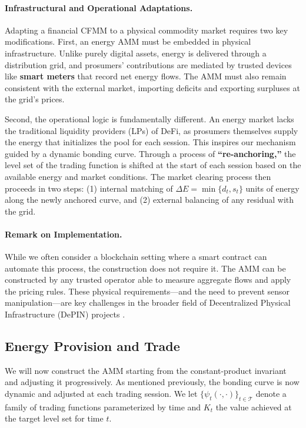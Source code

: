 \documentclass[12pt, notitlepage]{article}
\begin{document}
\paragraph{Infrastructural and Operational Adaptations.}
Adapting a financial CFMM to a physical commodity market requires two key modifications. First, an energy AMM must be embedded in physical infrastructure. Unlike purely digital assets, energy is delivered through a distribution grid, and prosumers' contributions are mediated by trusted devices like \textbf{smart meters} that record net energy flows. The AMM must also remain consistent with the external market, importing deficits and exporting surpluses at the grid's prices.

Second, the operational logic is fundamentally different. An energy market lacks the traditional liquidity providers (LPs) of DeFi, as prosumers themselves supply the energy that initializes the pool for each session. This inspires our mechanism guided by a dynamic bonding curve. Through a process of \textbf{“re-anchoring,”} the level set of the trading function is shifted at the start of each session based on the available energy and market conditions. The market clearing process then proceeds in two steps: (1) internal matching of $\Delta E = \min\{d_t,s_t\}$ units of energy along the newly anchored curve, and (2) external balancing of any residual with the grid.

\paragraph{Remark on Implementation.}
While we often consider a blockchain setting where a smart contract can automate this process, the construction does not require it. The AMM can be constructed by any trusted operator able to measure aggregate flows and apply the pricing rules. These physical requirements—and the need to prevent sensor manipulation—are key challenges in the broader field of Decentralized Physical Infrastructure (DePIN) projects \citep{milionis2025depin}.

\subsection{Energy Provision and Trade}


We will now construct the AMM starting from the constant-product invariant and adjusting it progressively. As mentioned previously, the bonding curve is now dynamic and adjusted at each trading session. We let $\{\psi_t(\cdot, \cdot)\}_{t\in \mathcal T}$ denote a family of trading functions parameterized by time and $K_t$ the value achieved at the target level set for time $t$.    
\end{document}
